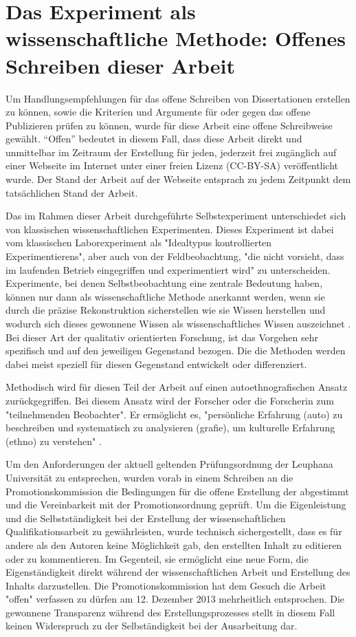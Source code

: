 \section{Das Experiment als wissenschaftliche Methode: Offenes Schreiben dieser Arbeit}

Um Handlungsempfehlungen für das offene Schreiben von Dissertationen erstellen zu können, sowie die Kriterien und Argumente für oder gegen das offene Publizieren prüfen zu können, wurde für diese Arbeit eine offene Schreibweise gewählt. “Offen” bedeutet in diesem Fall, dass diese Arbeit direkt und unmittelbar im Zeitraum der Erstellung für jeden, jederzeit frei zugänglich auf einer Webseite im Internet unter einer freien Lizenz (CC-BY-SA) veröffentlicht wurde. Der Stand der Arbeit auf der Webseite entsprach zu jedem Zeitpunkt dem tatsächlichen Stand der Arbeit.

Das im Rahmen dieser Arbeit durchgeführte Selbstexperiment unterschiedet sich von klassischen wissenschaftlichen Experimenten. Dieses Experiment ist dabei vom klassischen Laborexperiment als "Idealtypus kontrollierten Experimentierens", aber auch von der Feldbeobachtung, "die nicht vorsieht, dass im laufenden Betrieb eingegriffen und experimentiert wird" \cite{FQS196} zu unterscheiden. Experimente, bei denen Selbstbeobachtung eine zentrale Bedeutung haben, können nur dann als wissenschaftliche Methode anerkannt werden, wenn sie durch die präzise Rekonstruktion sicherstellen wie sie Wissen herstellen und wodurch sich dieses gewonnene Wissen als wissenschaftliches Wissen auszeichnet \cite{solhdju_2011_selbstexperimente}. Bei dieser Art der qualitativ orientierten Forschung, ist das Vorgehen sehr spezifisch und auf den jeweiligen Gegenstand bezogen. Die die Methoden werden dabei meist speziell für diesen Gegenstand entwickelt oder differenziert\cite{Mayring_1999:119}.

Methodisch wird für diesen Teil der Arbeit auf einen autoethnografischen Ansatz zurückgegriffen. Bei diesem Ansatz wird der Forscher oder die Forscherin zum "teilnehmenden Beobachter"\cite{Ellis_2010}. Er ermöglicht es, "persönliche Erfahrung (auto) zu beschreiben und systematisch zu analysieren (grafie), um kulturelle Erfahrung (ethno) zu verstehen" \cite{Ellis_2010}.

Um den Anforderungen der aktuell geltenden Prüfungsordnung der Leuphana Universität zu entsprechen, wurden vorab in einem Schreiben an die Promotionskommission die Bedingungen für die offene Erstellung der abgestimmt und die Vereinbarkeit mit der Promotionsordnung geprüft. Um die Eigenleistung und die Selbstständigkeit bei der Erstellung der wissenschaftlichen Qualifikationsarbeit zu gewährleisten, wurde technisch sichergestellt, dass es für andere als den Autoren keine Möglichkeit gab, den erstellten Inhalt zu editieren oder zu kommentieren. Im Gegenteil, sie ermöglicht eine neue Form, die Eigenständigkeit direkt während der wissenschaftlichen Arbeit und Erstellung des Inhalts darzustellen. Die Promotionskommission hat dem Gesuch die Arbeit "offen" verfassen zu dürfen am 12. Dezember 2013 mehrheitlich entsprochen. Die gewonnene Transparenz während des Erstellungsprozesses stellt in diesem Fall keinen Widerspruch zu der Selbständigkeit bei der Ausarbeitung dar.

